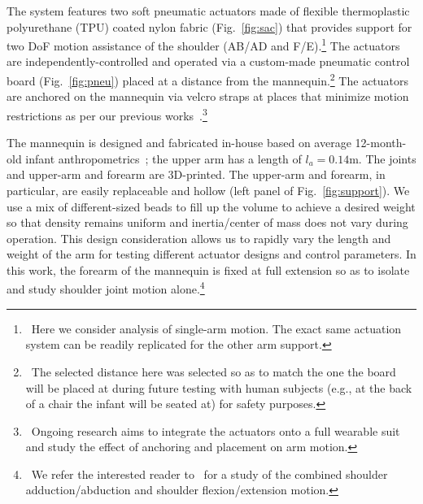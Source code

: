 \documentclass[letterpaper, 10pt, conference]{ieeeconf}      %
\begin{document}
The system features two soft pneumatic actuators made of flexible thermoplastic polyurethane (TPU) coated nylon fabric (Fig.~\ref{fig:sac}) that provides support for two DoF motion assistance of the shoulder (AB/AD and F/E).\footnote{~Here we consider analysis of single-arm motion. The exact same actuation system can be readily replicated for the other arm support.} 
The actuators are independently-controlled and operated via a custom-made pneumatic control board (Fig.~\ref{fig:pneu}) placed at a distance from the mannequin.\footnote{~The selected distance here was selected so as to match the one the board will be placed at during future testing with human subjects (e.g., at the back of a chair the infant will be seated at) for safety purposes.} 
The actuators are anchored on the mannequin via velcro straps at places that minimize motion restrictions as per our previous works~\cite{kokkoni2020development,mucchiani2022closed,sahin2022bidirectional}.\footnote{~Ongoing research aims to integrate the actuators onto a full wearable suit and study the effect of anchoring and placement on arm motion.} 

The mannequin is designed and fabricated in-house based on average 12-month-old infant anthropometrics~\cite{Fryar2021,edmond2020normal}; the upper arm has a length of $l_a=0.14$\;m. The joints and upper-arm and forearm are 3D-printed. The upper-arm and forearm, in particular, are easily replaceable and hollow (left panel of Fig.~\ref{fig:support}).
We use a mix of different-sized beads to fill up the volume to achieve a desired weight so that density remains uniform and inertia/center of mass does not vary during operation. This design consideration allows us to rapidly vary the length and weight of the arm for testing different actuator designs and control parameters. In this work, the forearm of the mannequin is fixed at full extension so as to isolate and study shoulder joint motion alone.\footnote{~We refer the interested reader to~\cite{kokkoni2020development,mucchiani2022closed} for a study of the combined shoulder adduction/abduction and shoulder flexion/extension motion.}
\end{document}
